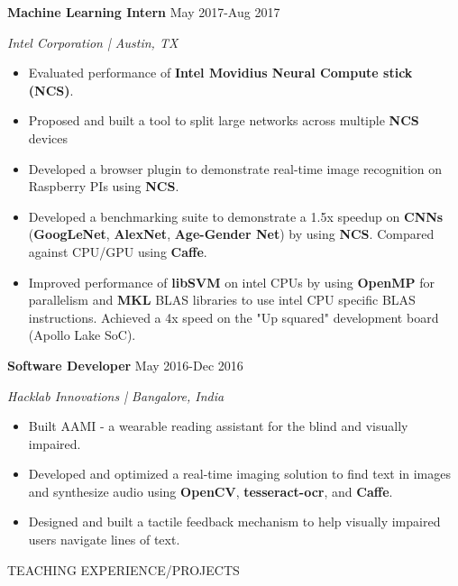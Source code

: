 \documentclass[paper=a4,fontsize=11pt]{scrartcl} %
\newcommand{\sepspace}{\vspace*{1em}}		%
\newcommand{\NewPart}[1]{ \noindent \large \usefont{OT1}{phv}{b}{n}\uppercase{#1} \normalfont \normalsize}
\newcommand{\EducationEntry}[4]{
		\noindent \textbf{#1}     %
			\hfill#2 \par  %
		\noindent \textit{#3} \par        %
		\noindent\hangafter=0 \small #4 %
		\normalsize \par}
\begin{document}
\EducationEntry{Machine Learning Intern}{May 2017-Aug 2017}{Intel Corporation | Austin, TX}{
\begin{itemize}
  \item Evaluated performance of \textbf{ Intel Movidius Neural Compute stick (NCS)}.
  \item Proposed and built a tool to split large networks across multiple \textbf{NCS} devices
  \item Developed a browser plugin to demonstrate real-time image recognition on Raspberry PIs using \textbf{NCS}.
  \item Developed a benchmarking suite to demonstrate a 1.5x speedup on \textbf{CNNs}  (\textbf{GoogLeNet}, \textbf{AlexNet}, \textbf{Age-Gender Net}) by using \textbf{NCS}. Compared against CPU/GPU using \textbf{Caffe}.
  \item Improved performance of \textbf{libSVM} on intel CPUs by using \textbf{OpenMP} for parallelism and \textbf{MKL} BLAS libraries to use intel CPU specific BLAS instructions. Achieved a 4x speed on the "Up squared" development board (Apollo Lake SoC).
\end{itemize}
}

\EducationEntry{Software Developer}{May 2016-Dec 2016}{Hacklab Innovations | Bangalore, India}{
\begin{itemize}
\item Built AAMI - a wearable reading assistant for the blind and visually impaired.
\item Developed and optimized a real-time imaging solution to find text in images and synthesize audio using \textbf{OpenCV}, \textbf{tesseract-ocr}, and \textbf{Caffe}.
\item Designed and built a tactile feedback mechanism to help visually impaired users navigate lines of text.
\end{itemize}
}


\sepspace
\NewPart{Teaching Experience/Projects}{}
\newline
\end{document}
